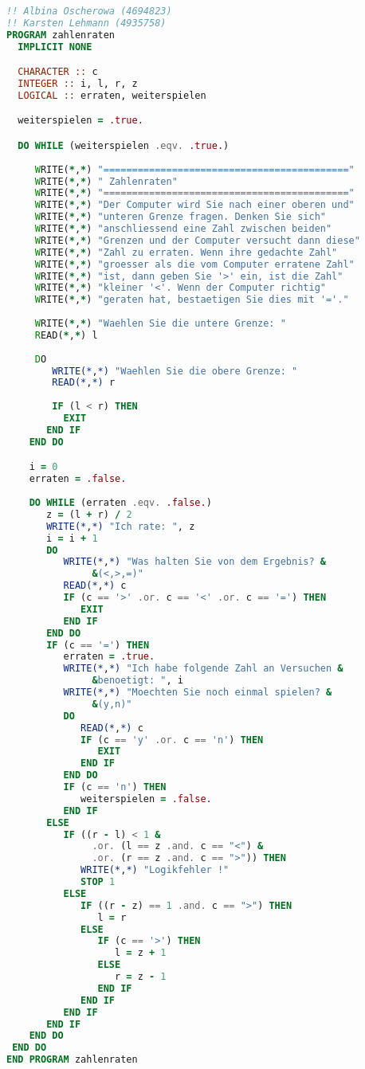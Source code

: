 \documentclass{article}
\begin{document}
\begin{lstlisting}[language=Fortran, showstringspaces=false]
!! Albina Oscherowa (4694823)
!! Karsten Lehmann (4935758)
PROGRAM zahlenraten
  IMPLICIT NONE

  CHARACTER :: c
  INTEGER :: i, l, r, z
  LOGICAL :: erraten, weiterspielen

  weiterspielen = .true.

  DO WHILE (weiterspielen .eqv. .true.)
  
     WRITE(*,*) "==========================================="
     WRITE(*,*) " Zahlenraten"
     WRITE(*,*) "==========================================="
     WRITE(*,*) "Der Computer wird Sie nach einer oberen und"
     WRITE(*,*) "unteren Grenze fragen. Denken Sie sich"
     WRITE(*,*) "anschliessend eine Zahl zwischen beiden"
     WRITE(*,*) "Grenzen und der Computer versucht dann diese"
     WRITE(*,*) "Zahl zu erraten. Wenn ihre gedachte Zahl"
     WRITE(*,*) "groesser als die vom Computer erratene Zahl"
     WRITE(*,*) "ist, dann geben Sie '>' ein, ist die Zahl"
     WRITE(*,*) "kleiner '<'. Wenn der Computer richtig"
     WRITE(*,*) "geraten hat, bestaetigen Sie dies mit '='."
     
     WRITE(*,*) "Waehlen Sie die untere Grenze: "
     READ(*,*) l
  
     DO
        WRITE(*,*) "Waehlen Sie die obere Grenze: "
        READ(*,*) r
        
        IF (l < r) THEN
          EXIT
       END IF
    END DO

    i = 0
    erraten = .false.
    
    DO WHILE (erraten .eqv. .false.)
       z = (l + r) / 2
       WRITE(*,*) "Ich rate: ", z
       i = i + 1
       DO
          WRITE(*,*) "Was halten Sie von dem Ergebnis? &
               &(<,>,=)"
          READ(*,*) c
          IF (c == '>' .or. c == '<' .or. c == '=') THEN
             EXIT
          END IF
       END DO
       IF (c == '=') THEN
          erraten = .true.
          WRITE(*,*) "Ich habe folgende Zahl an Versuchen &
               &benoetigt: ", i
          WRITE(*,*) "Moechten Sie noch einmal spielen? &
               &(y,n)"
          DO
             READ(*,*) c
             IF (c == 'y' .or. c == 'n') THEN
                EXIT
             END IF
          END DO
          IF (c == 'n') THEN
             weiterspielen = .false.
          END IF
       ELSE
          IF ((r - l) < 1 &
               .or. (l == z .and. c == "<") &
               .or. (r == z .and. c == ">")) THEN
             WRITE(*,*) "Logikfehler !"
             STOP 1
          ELSE
             IF ((r - z) == 1 .and. c == ">") THEN
                l = r
             ELSE
                IF (c == '>') THEN
                   l = z + 1
                ELSE
                   r = z - 1
                END IF
             END IF
          END IF
       END IF
    END DO
 END DO
END PROGRAM zahlenraten
\end{lstlisting}
\end{document}
